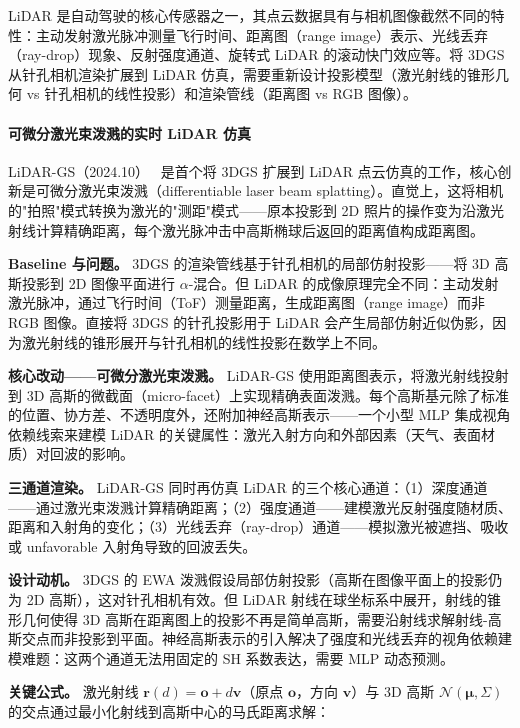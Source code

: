 LiDAR 是自动驾驶的核心传感器之一，其点云数据具有与相机图像截然不同的特性：主动发射激光脉冲测量飞行时间、距离图（range image）表示、光线丢弃（ray-drop）现象、反射强度通道、旋转式 LiDAR 的滚动快门效应等。将 3DGS 从针孔相机渲染扩展到 LiDAR 仿真，需要重新设计投影模型（激光射线的锥形几何 vs 针孔相机的线性投影）和渲染管线（距离图 vs RGB 图像）。

\paragraph{可微分激光束泼溅的实时 LiDAR 仿真}

LiDAR-GS（2024.10）~\cite{2410_05111} 是首个将 3DGS 扩展到 LiDAR 点云仿真的工作，核心创新是可微分激光束泼溅（differentiable laser beam splatting）。直觉上，这将相机的"拍照"模式转换为激光的"测距"模式——原本投影到 2D 照片的操作变为沿激光射线计算精确距离，每个激光脉冲击中高斯椭球后返回的距离值构成距离图。

\textbf{Baseline 与问题。} 3DGS 的渲染管线基于针孔相机的局部仿射投影——将 3D 高斯投影到 2D 图像平面进行 $\alpha$-混合。但 LiDAR 的成像原理完全不同：主动发射激光脉冲，通过飞行时间（ToF）测量距离，生成距离图（range image）而非 RGB 图像。直接将 3DGS 的针孔投影用于 LiDAR 会产生局部仿射近似伪影，因为激光射线的锥形展开与针孔相机的线性投影在数学上不同。

\textbf{核心改动——可微分激光束泼溅。} LiDAR-GS 使用距离图表示，将激光射线投射到 3D 高斯的微截面（micro-facet）上实现精确表面泼溅。每个高斯基元除了标准的位置、协方差、不透明度外，还附加神经高斯表示——一个小型 MLP 集成视角依赖线索来建模 LiDAR 的关键属性：激光入射方向和外部因素（天气、表面材质）对回波的影响。

\textbf{三通道渲染。} LiDAR-GS 同时再仿真 LiDAR 的三个核心通道：（1）深度通道——通过激光束泼溅计算精确距离；（2）强度通道——建模激光反射强度随材质、距离和入射角的变化；（3）光线丢弃（ray-drop）通道——模拟激光被遮挡、吸收或 unfavorable 入射角导致的回波丢失。

\textbf{设计动机。} 3DGS 的 EWA 泼溅假设局部仿射投影（高斯在图像平面上的投影仍为 2D 高斯），这对针孔相机有效。但 LiDAR 射线在球坐标系中展开，射线的锥形几何使得 3D 高斯在距离图上的投影不再是简单高斯，需要沿射线求解射线-高斯交点而非投影到平面。神经高斯表示的引入解决了强度和光线丢弃的视角依赖建模难题：这两个通道无法用固定的 SH 系数表达，需要 MLP 动态预测。

\textbf{关键公式。} 激光射线 $\mathbf{r}(d) = \mathbf{o} + d\mathbf{v}$（原点 $\mathbf{o}$，方向 $\mathbf{v}$）与 3D 高斯 $\mathcal{N}(\boldsymbol{\mu}, \Sigma)$ 的交点通过最小化射线到高斯中心的马氏距离求解：

